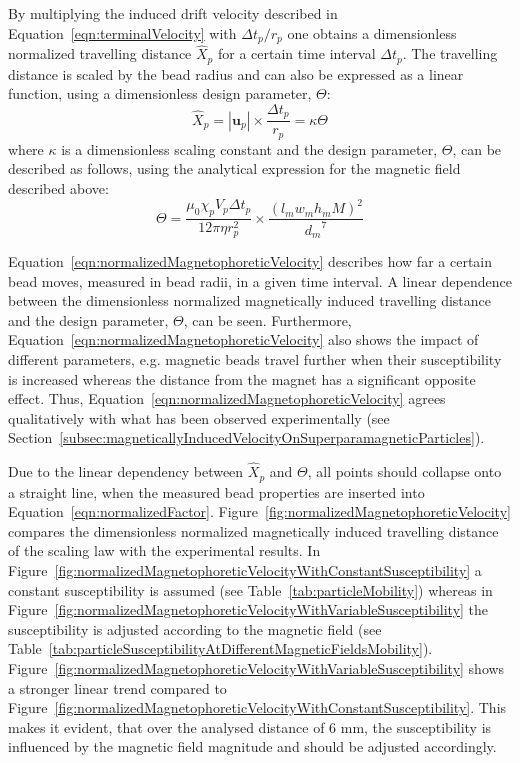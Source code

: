 By multiplying the induced drift velocity described in Equation~\ref{eqn:terminalVelocity} with $\Delta t_{p}/r_{p}$ one obtains a dimensionless normalized travelling distance $\hat{X}_{p}$ for a certain time interval $\Delta t_{p}$. The travelling distance is scaled by the bead radius and can also be expressed as a linear function, using a dimensionless design parameter, $\Theta$:
\begin{equation}
	\hat{X}_{p} = |\mathbf{u}_{p}|\times\frac{\Delta t_{p}}{r_{p}} = \kappa\Theta
	\label{eqn:normalizedMagnetophoreticVelocity}
\end{equation}
where $\kappa$ is a dimensionless scaling constant and the design parameter, $\Theta$, can be described as follows, using the analytical expression for the magnetic field described above:
\begin{equation}
	\Theta = \frac{\mu_{0}\chi_{p} V_{p}\Delta t_{p}}{12\pi\eta r_{p}^2}\times \frac{(l_{m}w_{m}h_{m}M)^{2}}{{d_{m}}^{7}}
	\label{eqn:normalizedFactor}
\end{equation}

Equation~\ref{eqn:normalizedMagnetophoreticVelocity} describes how far a certain bead moves, measured in bead radii, in a given time interval. A linear dependence between the dimensionless normalized magnetically induced travelling distance and the design parameter, $\Theta$, can be seen. Furthermore, Equation~\ref{eqn:normalizedMagnetophoreticVelocity} also shows the impact of different parameters, e.g. magnetic beads travel further when their susceptibility is increased whereas the distance from the magnet has a significant opposite effect. Thus, Equation~\ref{eqn:normalizedMagnetophoreticVelocity} agrees qualitatively with what has been observed experimentally (see Section~\ref{subsec:magneticallyInducedVelocityOnSuperparamagneticParticles}).

Due to the linear dependency between $\hat{X}_{p}$ and $\Theta$, all points should collapse onto a straight line, when the measured bead properties are inserted into Equation~\ref{eqn:normalizedFactor}. Figure~\ref{fig:normalizedMagnetophoreticVelocity} compares the dimensionless normalized magnetically induced travelling distance of the scaling law with the experimental results. In Figure~\ref{fig:normalizedMagnetophoreticVelocityWithConstantSusceptibility} a constant susceptibility is assumed (see Table~\ref{tab:particleMobility}) whereas in Figure~\ref{fig:normalizedMagnetophoreticVelocityWithVariableSusceptibility} the susceptibility is adjusted according to the magnetic field (see Table~\ref{tab:particleSusceptibilityAtDifferentMagneticFieldsMobility}). Figure~\ref{fig:normalizedMagnetophoreticVelocityWithVariableSusceptibility} shows a stronger linear trend compared to Figure~\ref{fig:normalizedMagnetophoreticVelocityWithConstantSusceptibility}. This makes it evident, that over the analysed distance of $6$ mm, the susceptibility is influenced by the magnetic field magnitude and should be adjusted accordingly.

